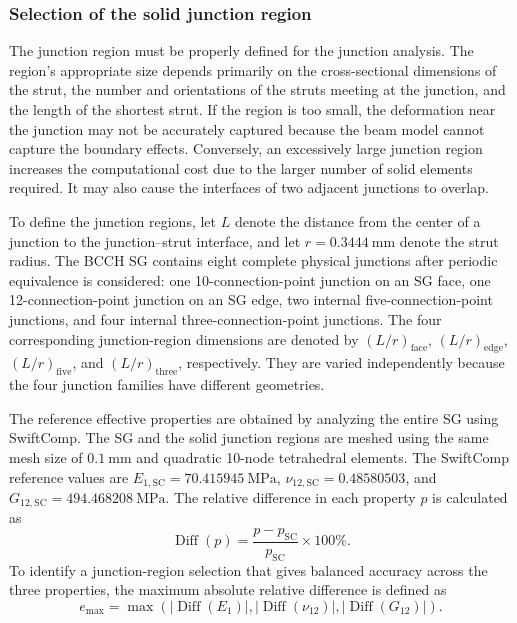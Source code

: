 \subsubsection{Selection of the solid junction region}

The junction region must be properly defined for the junction analysis. The region's appropriate size depends primarily on the cross-sectional dimensions of the strut, the number and orientations of the struts meeting at the junction, and the length of the shortest strut. If the region is too small, the deformation near the junction may not be accurately captured because the beam model cannot capture the boundary effects. Conversely, an excessively large junction region increases the computational cost due to the larger number of solid elements required. It may also cause the interfaces of two adjacent junctions to overlap.

To define the junction regions, let $L$ denote the distance from the center of a junction to the junction--strut interface, and let $r=0.3444~\text{mm}$ denote the strut radius. The BCCH SG contains eight complete physical junctions after periodic equivalence is considered: one 10-connection-point junction on an SG face, one 12-connection-point junction on an SG edge, two internal five-connection-point junctions, and four internal three-connection-point junctions. The four corresponding junction-region dimensions are denoted by $(L/r)_{\mathrm{face}}$, $(L/r)_{\mathrm{edge}}$, $(L/r)_{\mathrm{five}}$, and $(L/r)_{\mathrm{three}}$, respectively. They are varied independently because the four junction families have different geometries.

The reference effective properties are obtained by analyzing the entire SG using SwiftComp. The SG and the solid junction regions are meshed using the same mesh size of $0.1~\text{mm}$ and quadratic 10-node tetrahedral elements. The SwiftComp reference values are $E_{1,\mathrm{SC}}=70.415945~\text{MPa}$, $\nu_{12,\mathrm{SC}}=0.48580503$, and $G_{12,\mathrm{SC}}=494.468208~\text{MPa}$. The relative difference in each property $p$ is calculated as
\[
\operatorname{Diff}(p)
=
\frac{p-p_{\mathrm{SC}}}{p_{\mathrm{SC}}}\times100\%.
\]
To identify a junction-region selection that gives balanced accuracy across the three properties, the maximum absolute relative difference is defined as
\[
e_{\max}
=
\max\left(
\left|\operatorname{Diff}(E_1)\right|,
\left|\operatorname{Diff}(\nu_{12})\right|,
\left|\operatorname{Diff}(G_{12})\right|
\right).
\]

